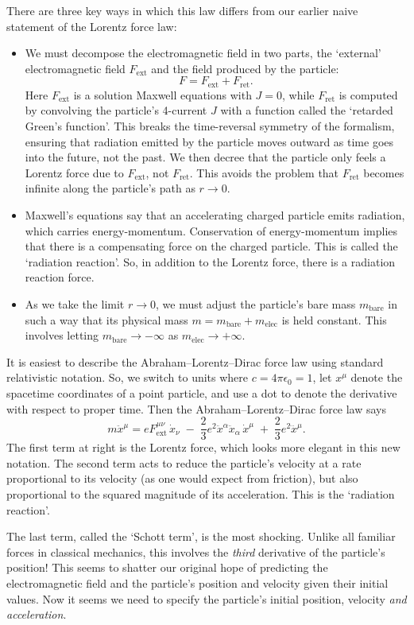 \documentclass{article}
\newcommand{\bare}{\mathrm{bare}}
\newcommand{\elec}{\mathrm{elec}}
\newcommand{\ret}{\mathrm{ret}}
\newcommand{\ext}{\mathrm{ext}}
\begin{document}
There are three key ways in which this law differs from our earlier naive statement of the Lorentz force law: 
\begin{itemize}
\item 
We must decompose the electromagnetic field in two parts, the `external' electromagnetic field $F_\ext$ and the field produced by the particle:
\[             F = F_\ext + F_\ret .  \]
Here $F_\ext$ is a solution Maxwell equations with $J = 0$, while $F_\ret$ is computed by convolving the particle's 4-current $J$ with a function called the `retarded Green's function'.  This breaks the time-reversal symmetry of the formalism, ensuring that radiation emitted by the particle moves outward as time goes into the future, not the past.   We then decree that the particle only feels a Lorentz force due to $F_\ext$, not $F_\ret$.  This avoids the problem that $F_\ret$ becomes infinite along the particle's path as $r \to 0$.
\item
Maxwell's equations say that an accelerating charged particle emits radiation, which carries energy-momentum.   Conservation of energy-momentum implies that there is a compensating force on the charged particle.  This is called the `radiation reaction'.  
So, in addition to the Lorentz force, there is a radiation reaction force.
\item 
As we take the limit $r \to 0$, we must adjust the particle's bare mass $m_\bare$ in 
such a way that its physical mass $m = m_\bare + m_\elec$ is held constant.   This involves letting $m_\bare \to -\infty$ as $m_\elec \to +\infty$.
\end{itemize}

It is easiest to describe the Abraham--Lorentz--Dirac force law using standard relativistic notation.  So, we switch to units where $c = 4 \pi \epsilon_0 = 1$, let $x^\mu$ denote the spacetime coordinates of a point particle, and use a dot to denote the derivative with respect to proper time.  Then the Abraham--Lorentz--Dirac force law says
\[   m \ddot{x}^\mu = e F_{\mathrm{ext}}^{\mu \nu} \,\dot{x}_\nu \; - \; 
\frac{2}{3}e^2 \ddot{x}^\alpha \ddot{x}_\alpha  \, \dot{x}^\mu \; + \; 
\frac{2}{3}e^2 \dddot{x}^\mu .\]
The first term at right is the Lorentz force, which looks more elegant in this new notation.  The second term acts to reduce the particle's velocity at a rate proportional to its velocity (as one would expect from friction), but also proportional to the squared magnitude of its acceleration.  This is the `radiation reaction'.

The last term, called the `Schott term', is the most shocking.  Unlike all familiar forces in classical mechanics, this involves the \emph{third} derivative of the particle's position!  This seems to shatter our original hope of predicting the electromagnetic field and the particle's position and velocity given their initial values.   Now it seems we need to specify the particle's initial position, velocity \emph{and acceleration}.  
\end{document}
